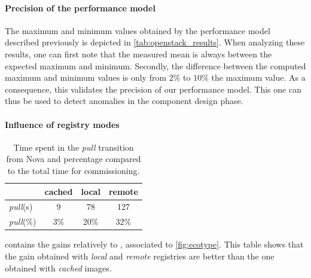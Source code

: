 \paragraph{Precision of the performance model}
The maximum and minimum values obtained by the performance model described
previously is depicted in \cref{tab:openstack_results}. When analyzing these
results, one can first note that the measured mean is always between the
expected maximum and minimum. Secondly, the difference between the computed
maximum and minimum values is only from $2\%$ to $10\%$ the maximum value. As a
consequence, this validates the precision of our performance model.
This one can thus be used to detect anomalies in the component design
phase.


\paragraph{Influence of registry modes}

\begin{table}
  \begin{center}
    \begin{tabular}{lccc}
      \toprule
      & cached & local & remote\\
      \midrule
      \emph{pull}(s) & 9 & 78 & 127\\
      \emph{pull}(\%) & 3\% & 20\% & 32\%\\
      \bottomrule
    \end{tabular}
    \caption{Time spent in the \emph{pull} transition from Nova and
    percentage compared to the total time for \ansass commissioning.}
    \label{tab:pull}
  \end{center}
\end{table}

 contains the gains relatively to \ansass,
associated to \cref{fig:ecotype}. This table shows that the gain
obtained with \emph{local} and \emph{remote} registries are better
than the one obtained with \emph{cached} \docker images.

